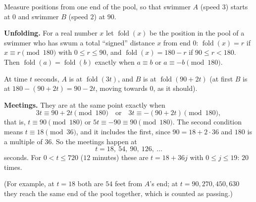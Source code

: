 Measure positions from one end of the pool, so that swimmer $A$ (speed $3$) starts at $0$ and swimmer $B$ (speed $2$) at $90$.

\textbf{Unfolding.} For a real number $x$ let $\operatorname{fold}(x)$ be the position in the pool of a swimmer who has swum a total ``signed'' distance $x$ from end $0$: $\operatorname{fold}(x)=r$ if $x\equiv r\pmod{180}$ with $0\le r\le90$, and $\operatorname{fold}(x)=180-r$ if $90\le r<180$. Then $\operatorname{fold}(a)=\operatorname{fold}(b)$ exactly when $a\equiv b$ or $a\equiv-b\pmod{180}$.

At time $t$ seconds, $A$ is at $\operatorname{fold}(3t)$, and $B$ is at $\operatorname{fold}(90+2t)$ (at first $B$ is at $180-(90+2t)=90-2t$, moving towards $0$, as it should).

\textbf{Meetings.} They are at the same point exactly when
\[
3t\equiv90+2t\pmod{180}\quad\text{or}\quad3t\equiv-(90+2t)\pmod{180},
\]
that is, $t\equiv90\pmod{180}$ or $5t\equiv-90\equiv90\pmod{180}$. The second condition means $t\equiv18\pmod{36}$, and it includes the first, since $90=18+2\cdot36$ and $180$ is a multiple of $36$. So the meetings happen at
\[
t=18,\ 54,\ 90,\ 126,\ \ldots
\]
seconds. For $0<t\le720$ ($12$ minutes) these are $t=18+36j$ with $0\le j\le19$: $\boxed{20}$ times.

(For example, at $t=18$ both are $54$ feet from $A$'s end; at $t=90,270,450,630$ they reach the same end of the pool together, which is counted as passing.)
